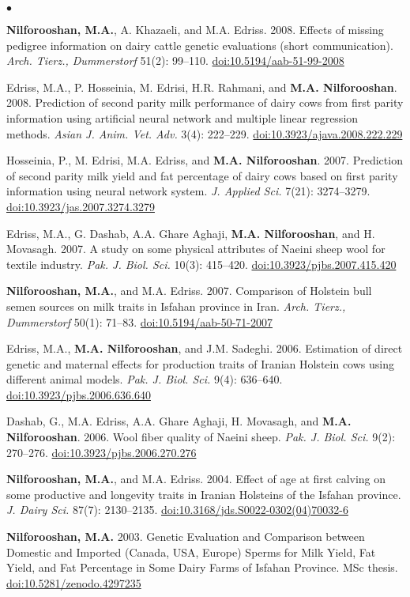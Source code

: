 \documentclass[margin,line]{res}
\newenvironment{list2}{
  \begin{list}{$\bullet$}{%
      \setlength{\itemsep}{0in}
      \setlength{\parsep}{0in} \setlength{\parskip}{0in}
      \setlength{\topsep}{0in} \setlength{\partopsep}{0in}
      \setlength{\leftmargin}{0.2in}}}{\end{list}}
\begin{document}
\begin{resume}
\begin{list2}
\item {\bf Nilforooshan, M.A.}, A. Khazaeli, and M.A. Edriss. 2008. Effects of missing pedigree information on dairy cattle genetic evaluations (short communication). {\em Arch. Tierz., Dummerstorf} 51(2): 99--110. \href{https://doi.org/10.5194/aab-51-99-2008}{doi:10.5194/aab-51-99-2008}
\item Edriss, M.A., P. Hosseinia, M. Edrisi, H.R. Rahmani, and {\bf M.A. Nilforooshan}. 2008. Prediction of second parity milk performance of dairy cows from first parity information using artificial neural network and multiple linear regression methods. {\em Asian J. Anim. Vet. Adv.} 3(4): 222--229. \href{https://doi.org/10.3923/ajava.2008.222.229}{doi:10.3923/ajava.2008.222.229}
\item Hosseinia, P., M. Edrisi, M.A. Edriss, and {\bf M.A. Nilforooshan}. 2007. Prediction of second parity milk yield and fat percentage of dairy cows based on first parity information using neural network system. {\em J. Applied Sci.} 7(21): 3274--3279. \href{https://doi.org/10.3923/jas.2007.3274.3279}{doi:10.3923/jas.2007.3274.3279}
\item Edriss, M.A., G. Dashab, A.A. Ghare Aghaji, {\bf M.A. Nilforooshan}, and H. Movasagh. 2007. A study on some physical attributes of Naeini sheep wool for textile industry. {\em Pak. J. Biol. Sci.} 10(3): 415--420. \href{https://doi.org/10.3923/pjbs.2007.415.420}{doi:10.3923/pjbs.2007.415.420}
\item {\bf Nilforooshan, M.A.}, and M.A. Edriss. 2007. Comparison of Holstein bull semen sources on milk traits in Isfahan province in Iran. {\em Arch. Tierz., Dummerstorf} 50(1): 71--83. \href{https://doi.org/10.5194/aab-50-71-2007}{doi:10.5194/aab-50-71-2007}
\item Edriss, M.A., {\bf M.A. Nilforooshan}, and J.M. Sadeghi. 2006. Estimation of direct genetic and maternal effects for production traits of Iranian Holstein cows using different animal models. {\em Pak. J. Biol. Sci.} 9(4): 636--640. \href{https://doi.org/10.3923/pjbs.2006.636.640}{doi:10.3923/pjbs.2006.636.640}
\item Dashab, G., M.A. Edriss, A.A. Ghare Aghaji, H. Movasagh, and {\bf M.A. Nilforooshan}. 2006. Wool fiber quality of Naeini sheep. {\em Pak. J. Biol. Sci.} 9(2): 270--276. \href{https://doi.org/10.3923/pjbs.2006.270.276}{doi:10.3923/pjbs.2006.270.276}
\item {\bf Nilforooshan, M.A.}, and M.A. Edriss. 2004. Effect of age at first calving on some productive and longevity traits in Iranian Holsteins of the Isfahan province. {\em J. Dairy Sci.} 87(7): 2130--2135. \href{https://doi.org/10.3168/jds.S0022-0302(04)70032-6}{doi:10.3168/jds.S0022-0302(04)70032-6}
\item {\bf Nilforooshan, M.A.} 2003. Genetic Evaluation and Comparison between Domestic and Imported (Canada, USA, Europe) Sperms for Milk Yield, Fat Yield, and Fat Percentage in Some Dairy Farms of Isfahan Province. MSc thesis. \href{https://doi.org/10.5281/zenodo.4297235}{doi:10.5281/zenodo.4297235}
\end{list2}

\end{resume}
\end{document}
